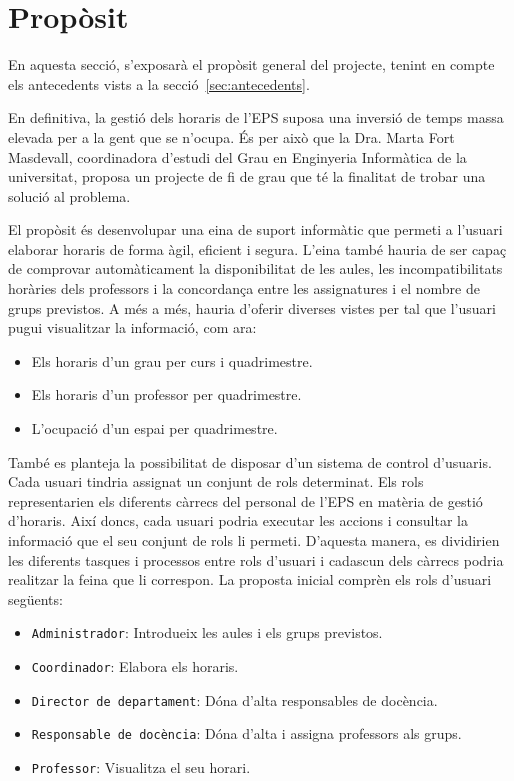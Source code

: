 \documentclass[a4paper,12pt]{ThesisStyle}
\begin{document}
\section{Propòsit}
\label{sec:proposit}

En aquesta secció, s'exposarà el propòsit general del projecte, tenint en compte els antecedents vists a la secció~\ref{sec:antecedents}.

En definitiva, la gestió dels horaris de l'EPS suposa una inversió de temps massa elevada per a la gent que se n'ocupa. És per això que la Dra. Marta Fort Masdevall, coordinadora d'estudi del Grau en Enginyeria Informàtica de la universitat, proposa un projecte de fi de grau que té la finalitat de trobar una solució al problema.

El propòsit és desenvolupar una eina de suport informàtic que permeti a l'usuari elaborar horaris de forma àgil, eficient i segura. L'eina també hauria de ser capaç de comprovar automàticament la disponibilitat de les aules, les incompatibilitats horàries dels professors i la concordança entre les assignatures i el nombre de grups previstos. A més a més, hauria d'oferir diverses vistes per tal que l'usuari pugui visualitzar la informació, com ara:
\begin{itemize}
  \item Els horaris d'un grau per curs i quadrimestre.
  \item Els horaris d'un professor per quadrimestre.
  \item L'ocupació d'un espai per quadrimestre.
\end{itemize}

També es planteja la possibilitat de disposar d'un sistema de control d'usuaris. Cada usuari tindria assignat un conjunt de rols determinat. Els rols representarien els diferents càrrecs del personal de l'EPS en matèria de gestió d'horaris. Així doncs, cada usuari podria executar les accions i consultar la informació que el seu conjunt de rols li permeti. D'aquesta manera, es dividirien les diferents tasques i processos entre rols d'usuari i cadascun dels càrrecs podria realitzar la feina que li correspon. La proposta inicial comprèn els rols d'usuari següents:
\begin{itemize}
  \item \texttt{Administrador}: Introdueix les aules i els grups previstos.
  \item \texttt{Coordinador}: Elabora els horaris.
  \item \texttt{Director de departament}: Dóna d'alta responsables de docència.
  \item \texttt{Responsable de docència}: Dóna d'alta i assigna professors als grups.
  \item \texttt{Professor}: Visualitza el seu horari.
\end{itemize}
\end{document}
